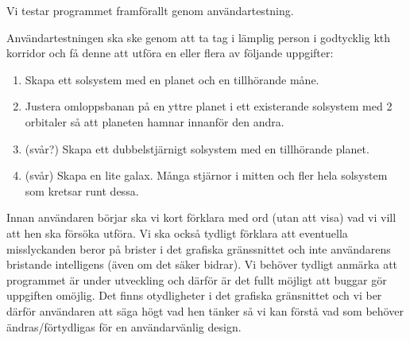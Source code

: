 
Vi testar programmet framförallt genom användartestning.

Användartestningen ska ske genom att ta tag i lämplig person
i godtycklig kth korridor och få denne att utföra en eller flera
av följande uppgifter:
\begin{enumerate}
    \item Skapa ett solsystem med en planet och en tillhörande måne.
    \item Justera omloppsbanan på en yttre planet i ett existerande
        solsystem med 2 orbitaler så att planeten hamnar innanför den andra.
    \item (svår?) Skapa ett dubbelstjärnigt solsystem med en tillhörande planet. %
    \item (svår) Skapa en lite galax. %
        Många stjärnor i mitten och fler hela solsystem som kretsar runt dessa.
\end{enumerate}

Innan användaren börjar ska vi kort förklara med ord (utan att visa)
vad vi vill att hen ska försöka utföra.
Vi ska också tydligt förklara att eventuella misslyckanden
beror på brister i det grafiska gränssnittet och
inte användarens bristande intelligens (även om det säker bidrar).
Vi behöver tydligt anmärka att programmet är under utveckling och
därför är det fullt möjligt att buggar gör uppgiften omöjlig.
Det finns otydligheter i det grafiska gränsnittet och vi ber därför
användaren att säga högt vad hen tänker så vi kan förstå vad som
behöver ändras/förtydligas för en användarvänlig design.

